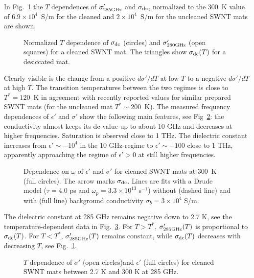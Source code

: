 \begin{multicols}{2}
In Fig.~\ref{fig1} the $T$ dependences of $\sigma'_{\rm 285 GHz}$ and
$\sigma_{\rm dc}$, normalized to the 300~K value of $6.9\times 10^4$~S/m for
the cleaned and $2\times 10^4$~S/m for the uncleaned SWNT mats are shown.
\begin{figure}[htb]
\begin{center}
\leavevmode
{}
\end{center}
\caption{Normalized $T$ dependence of $\sigma_{\rm dc}$
(circles) and $\sigma'_{280 {\rm GHz}}$ (open squares) for a cleaned SWNT
mat. The triangles show $\sigma_{\rm dc}(T)$ for a desiccated mat.}
\label{fig1}
\end{figure}
Clearly visible is the change from a positive $d\sigma'/dT$ at low
$T$ to a negative $d\sigma'/dT$ at high $T$. The transition temperatures
between the two regimes is close to $T^*= 120$~K in agreement with recently
reported values for similar prepared SWNT mats\cite{Fischer97} (for the
uncleaned mat $T^* \sim 200$~K).  The measured frequency dependences of
$\epsilon'$ and $\sigma'$   show the following main features, see
Fig~\ref{fig2}: the conductivity almost keeps its dc value up to about 10 GHz
and decreases at higher frequencies. Saturation is observed close to 1
THz. The dielectric constant increases from $\epsilon' \sim -10^4$
in the 10 GHz-regime to $\epsilon' \sim -100$ close to 1 THz, apparently
approaching the regime of $\epsilon'> 0$ at still higher frequencies.
\begin{figure}[htb]
\begin{center}
\leavevmode
{}
\end{center}
\caption{Dependence on $\omega$ of $\epsilon'$ and $\sigma'$ for cleaned SWNT
mats at 300~K (full circles). The arrow marks $\sigma_{\rm dc}$.
Lines are fits with a Drude model ($\tau= 4.0$ ps and $\omega_p = 3.3 \times
10^{13}$ s$^{-1}$) without (dashed line) and with (full line) background
conductivity $\sigma_b = 3\times10^4$ S/m.  }
\label{fig2}
\end{figure}
The dielectric constant at 285 GHz remains negative down to 2.7 K, see the
temperature-dependent data in Fig.~\ref{fig3}. For $T > T^*$, $\sigma'_{285
{\rm GHz}}(T)$ is proportional to $\sigma_{\rm dc}(T)$.  For $T < T^*$,
$\sigma'_{285 {\rm GHz}}(T)$ remains constant, while $\sigma_{\rm dc}(T)$
decreases with decreasing $T$, see Fig.~\ref{fig1}.
\begin{figure}[htb]
\begin{center}
\leavevmode
{}
\end{center}
\caption{$T$ dependence of $\sigma'$ (open circles)and $\epsilon'$ (full
circles) for cleaned SWNT mats between 2.7 K and 300 K at 285 GHz.}
\label{fig3}
\end{figure}


\end{multicols}
